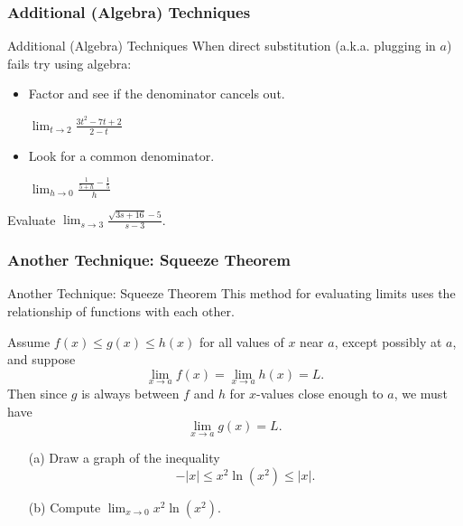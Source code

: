 \documentclass[cal1spr16Lectures.tex]{subfiles}
\begin{document}
\subsubsection{Additional (Algebra) Techniques}
\begin{frame}{\small Additional (Algebra) Techniques}\footnotesize
When direct substitution (a.k.a. plugging in $a$) fails try using algebra:

\vspace{0.25pc}
\begin{itemize}
\item Factor and see if the denominator cancels out.
\begin{ex} $\lim_{t \to 2} \frac{3t^2-7t+2}{2-t}$ \end{ex}

\vspace{0.25pc}
\item Look for a common denominator.
\begin{ex} $\lim_{h \to 0} \frac{ \frac{1}{5+h}-\frac{1}{5} }{h}$ \end{ex}
\end{itemize}
\end{frame}

\begin{frame}
\begin{exe}
Evaluate $\lim_{s\to 3}\frac{\sqrt{3s+16}-5}{s-3}$.
\end{exe}
\end{frame}

\subsubsection{Another Technique: Squeeze Theorem}
\begin{frame}{\small Another Technique: Squeeze Theorem}
This method for evaluating limits uses the relationship of functions with each other.

\begin{thm}\footnotesize  Assume $f(x)\leq g(x)\leq h(x)$ for all values of $x$ near $a$, except possibly at $a$, and suppose
\[\lim_{x \to a}f(x)=\lim_{x \to a} h(x)=L.\] 
Then since $g$ is always between $f$ and $h$ for $x$-values close enough to $a$, we must have 
\[\lim_{x \to a} g(x)=L.\] \end{thm}
\end{frame}

\begin{frame}
\begin{ex} \begin{itemize}
\item[(a)]Draw a graph of the inequality 
\[-|x| \leq x^2 \ln{(x^2)} \leq |x|.\]

\vspace{0.5pc}
\item[(b)] Compute $\lim_{x \to 0} x^2 \ln{(x^2)}.$
\end{itemize}
\end{ex}
\end{frame}
\end{document}

